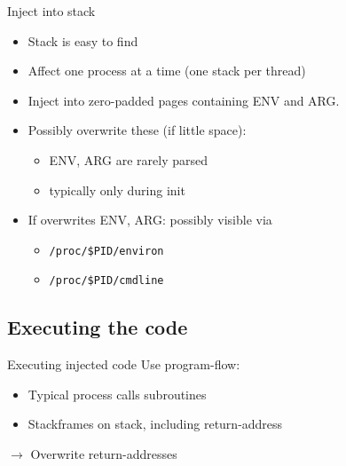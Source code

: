 \documentclass{beamer}
\newenvironment{itemizeframe}[1]
  {\begin{frame}{#1}\startitemizeframe}
  {\stopitemizeframe\end{frame}}
\newcommand\startitemizeframe{\begin{itemize}}
\newcommand\stopitemizeframe{\end{itemize}}
\begin{document}
		\begin{itemizeframe}{Inject into stack}
			\item Stack is easy to find
			\item Affect one process at a time (one stack per thread)
			\item Inject into zero-padded pages containing ENV and ARG.
			\item Possibly overwrite these (if little space):
			\begin{itemize}
				\item ENV, ARG are rarely parsed
				\item typically only during init
			\end{itemize}
			\item If overwrites ENV, ARG: possibly visible via
			\begin{itemize}
				\item \texttt{/proc/\$PID/environ}
				\item \texttt{/proc/\$PID/cmdline}
			\end{itemize}
		\end{itemizeframe}

	\subsection{Executing the code}

		\begin{frame}{Executing injected code}
			Use program-flow:
			\begin{itemize}
				\item Typical process calls subroutines
				\item Stackframes on stack, including return-address
			\end{itemize}
			$\rightarrow$ Overwrite return-addresses
		\end{frame}

\end{document}

